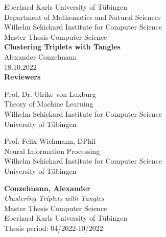 \documentclass[twoside,12pt,a4paper]{report}
\begin{document}
 
\begin{titlepage}
 \begin{center}
  {\LARGE Eberhard Karls University of T\"ubingen}\\
  {\large Department of Mathematics and Natural Sciences \\
Wilhelm Schickard Institute for Computer Science\\[4cm]}
  {\huge Master Thesis Computer Science\\[2cm]}
  {\Large\bf  Clustering Triplets with Tangles \\[1.5cm]}
 {\large Alexander Conzelmann}\\[0.5cm]
18.10.2022\\[4cm]
{\small\bf Reviewers}\\[0.5cm]
  \parbox{7cm}{\begin{center}{\large Prof. Dr. Ulrike von Luxburg}\\
   Theory of Machine Learning\\
  {\footnotesize Wilhelm Schickard Institute for Computer Science\\
	University of T\"ubingen}\end{center}}\hfill\parbox{7cm}{\begin{center}
  {\large Prof. Felix Wichmann, DPhil}\\
  Neural Information Processing\\
  {\footnotesize Wilhelm Schickard Institute for Computer Science\\
	University of T\"ubingen}\end{center}
 }
  \end{center}
\end{titlepage}


\thispagestyle{empty}
\vspace*{\fill}
\begin{minipage}{11.2cm}
\textbf{Conzelmann, Alexander}\\
\emph{Clustering Triplets with Tangles}\\ Master Thesis Computer Science\\
Eberhard Karls University of T\"ubingen\\
Thesis period: 04/2022-10/2022
\end{minipage}
\newpage
\end{document}
